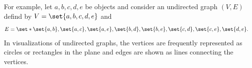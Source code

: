 For example, let $a, b, c, d, e$ be objects and consider an undirected graph $(V, E)$ defind by
$V = \set{a, b, c, d, e}$
and
\[
  E = \set*{\set{a, b}, \set{a, c}, \set{a, e}, \set{b, d}, \set{b, e}, \set{c, d}, \set{c, e}, \set{d,e}}.
\]
In visualizations of undirected graphs, the vertices are frequently represented as circles or rectangles in the plane and edges are shown as lines connecting the vertices.

